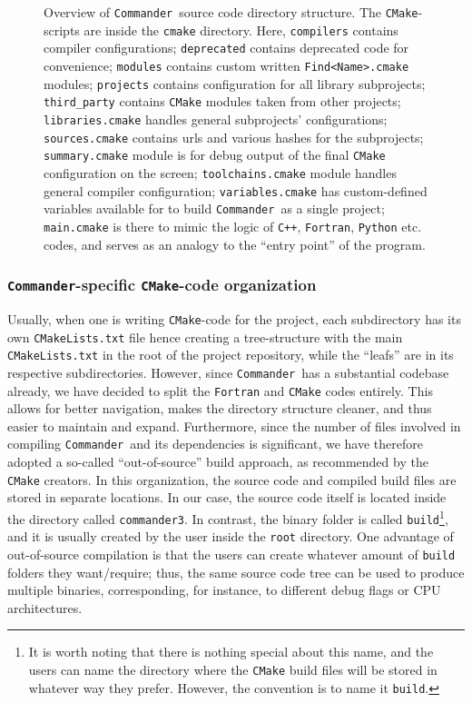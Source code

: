 \documentclass[twocolumn]{openjournal}
\def\commander{\texttt{Commander}}
\begin{document}
\begin{figure}[t]
\begin{center}
\end{center}
    \caption{Overview of \commander\ source code directory structure. 
    The \texttt{CMake}-scripts are inside the \texttt{cmake} directory. Here, 
    \texttt{compilers} contains compiler configurations; 
    \texttt{deprecated} contains deprecated code for convenience; 
    \texttt{modules} contains custom written \texttt{Find<Name>.cmake} modules; 
    \texttt{projects} contains configuration for all library subprojects; 
    \texttt{third\_party} contains \texttt{CMake} modules taken from other projects; 
    \texttt{libraries.cmake} handles general subprojects' configurations; 
    \texttt{sources.cmake} contains urls and various hashes for the subprojects; 
    \texttt{summary.cmake} module is for debug output of the final \texttt{CMake} configuration 
    on the screen; 
    \texttt{toolchains.cmake} module handles general compiler configuration; 
    \texttt{variables.cmake} has custom-defined variables available for to build \commander\
    as a single project; 
    \texttt{main.cmake} is there to mimic the logic of \texttt{C++}, \texttt{Fortran}, 
    \texttt{Python} etc. codes, and serves as an analogy to the ``entry point'' of the program.}
    \label{fig:source}
\end{figure}


\subsubsection{\commander-specific \texttt{CMake}-code organization}

Usually, when one is writing \texttt{CMake}-code for the project, each
subdirectory has its own \texttt{CMakeLists.txt} file hence creating a
tree-structure with the main \texttt{CMakeLists.txt} in the root of the project
repository, while the ``leafs'' are in its respective subdirectories. However,
since \commander\ has a substantial codebase already, we have decided to split
the \texttt{Fortran} and \texttt{CMake} codes entirely. This allows for better
navigation, makes the directory structure cleaner, and thus easier to maintain
and expand. Furthermore, since the number of files involved in compiling
\commander\ and its dependencies is significant, we have therefore adopted a
so-called ``out-of-source'' build approach, as recommended by the
\texttt{CMake} creators. In this organization, the source code and compiled
build files are stored in separate locations. In our case, the source code
itself is located inside the directory called \texttt{commander3}. In contrast,
the binary folder is called \texttt{build}\footnote{It is worth noting that
there is nothing special about this name, and the users can name the directory
where the \texttt{CMake} build files will be stored in whatever way they
prefer. However, the convention is to name it \texttt{build}.}, and it is
usually created by the user inside the \texttt{root} directory. One advantage
of out-of-source compilation is that the users can create whatever amount of
\texttt{build} folders they want/require; thus, the same source code tree can
be used to produce multiple binaries, corresponding, for instance, to different
debug flags or CPU architectures.
\end{document}
